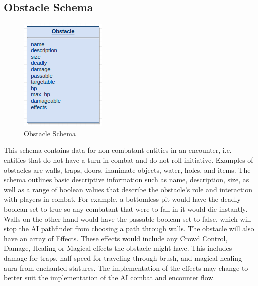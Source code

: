 \documentclass[12pt,a4paper]{report}
\begin{document}
\subsection{Obstacle Schema}
\begin{figure}[H]
	\centering
	\includegraphics[scale=.9]{schema-obstacle}
	\caption{Obstacle Schema}
	\label{fig: Obstacle Schema }
\end{figure}
This schema contains data for non-combatant entities in an encounter, i.e. entities that do not have a turn in combat and do not roll initiative. Examples of obstacles are walls, traps, doors, inanimate objects, water, holes, and items. The schema outlines basic descriptive information such as name, description, size, as well as a range of boolean values that describe the obstacle's role and interaction with players in combat. For example, a bottomless pit would have the deadly boolean set to true so any combatant that were to fall in it would die instantly. Walls on the other hand would have the passable boolean set to false, which will stop the AI pathfinder from choosing a path through walls. The obstacle will also have an array of Effects. These  effects would include any Crowd Control, Damage, Healing or Magical effects the obstacle might have. This includes damage for traps, half speed for traveling through brush, and magical healing aura from enchanted statures. The implementation of the effects may change to better suit the implementation of the AI combat and encounter flow.
\end{document}
